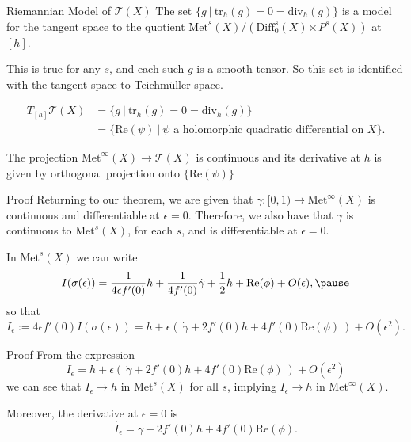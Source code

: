 \documentclass[professionalfont]{beamer}
\begin{document}
\begin{frame}{Riemannian Model of $\mathcal{T}(X)$}
The set $\{ g \ | \ \mathrm{tr}_h (g) = 0 = \mathrm{div}_h(g) \}$ is a model for the tangent space to the quotient $\mathrm{Met}^s(X)/(\mathrm{Diff}_0^s(X) \ltimes P^s(X))$  at $[h]$. 
\newline

This is true for any $s$, and each such $g$ is a smooth tensor. So this set is identified with the tangent space to Teichm\"uller space. \pause

\begin{align*}
T_{[h]}\mathcal{T}(X)
&= \{ g \ | \ \mathrm{tr}_h (g) = 0 = \mathrm{div}_h(g) \} \\
&= \{ \mathrm{Re}(\psi) \ | \ \psi \text{ a holomorphic quadratic differential on } X \}.
\end{align*} \pause

The projection $\mathrm{Met}^\infty(X) \to \mathcal{T}(X)$ is continuous and its derivative at $h$ is given by orthogonal projection onto $\{ \mathrm{Re}(\psi) \}$




\end{frame}







\begin{frame}{Proof}
Returning to our theorem, we are given that $\gamma:[0,1) \to \mathrm{Met}^\infty(X)$ is continuous and differentiable at $\epsilon = 0$. 
Therefore, we also have that $\gamma$ is continuous to $\mathrm{Met}^s(X)$, for each $s$, and is differentiable at $\epsilon = 0$. \pause
\newline

In $\mathrm{Met}^s(X)$ we can write 
\[
I(\sigma(\epsilon)) =  \frac{1}{4\epsilon f'(0)} h + \frac{1}{4 f'(0)} \dot{\gamma} + \frac{1}{2} h + \mathrm{Re}(\phi) + O(\epsilon), \pause
\]
so that 
\[
I_\epsilon := 4\epsilon f'(0)I(\sigma(\epsilon)) = h + \epsilon( \ \dot{\gamma} + 2 f'(0)h + 4 f'(0) \mathrm{Re}(\phi) \ ) + O(\epsilon^2).
\]

\end{frame}




\begin{frame}{Proof}
From the expression
\[
I_\epsilon = h + \epsilon( \ \dot{\gamma} + 2 f'(0)h + 4 f'(0) \mathrm{Re}(\phi) \ ) + O(\epsilon^2)
\]
we can see that $I_\epsilon \to h$ in $\mathrm{Met}^s(X)$ for all $s$, implying $I_\epsilon \to h$ in $\mathrm{Met}^\infty(X)$. 
\newline

Moreover, the derivative at $\epsilon = 0$ is 
\[
\dot{I_\epsilon}  = \dot{\gamma} + 2 f'(0) h + 4 f'(0) \mathrm{Re}(\phi).
\]

\end{frame}
\end{document}
